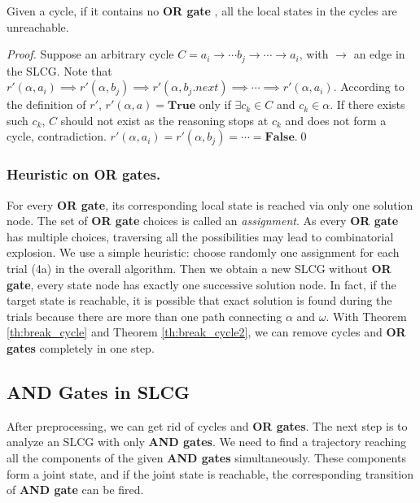 \documentclass[runningheads]{llncs}
\begin{document}
\begin{theorem}\label{th:break_cycle2}
Given a cycle, if it contains no \textbf{OR gate}%
, all the local states in the cycles are unreachable.
\end{theorem}

\begin{proof}
Suppose an arbitrary cycle $C=a_i\to \cdots b_j\to\cdots \to a_i$, with $\to$ an edge in the SLCG.
Note that $r'(\alpha,a_i)\implies r'(\alpha,b_j)\implies r'(\alpha,b_j.next)\implies \cdots\implies r'(\alpha,a_i)$.
According to the definition of $r'$, $r'(\alpha,a)=\mathbf{True}$ only if $\exists c_k\in C$ and $c_k\in \alpha$.
If there exists such $c_k$, $C$ should not exist as the reasoning stops at $c_k$ and does not form a cycle, contradiction.
$r'(\alpha,a_i)=r'(\alpha,b_j)=\cdots =\mathbf{False}$.\qed
\end{proof}

\subsubsection{Heuristic on OR gates.}\label{sec:OR}
For every \textbf{OR gate}, its corresponding local state is reached via only one solution node.
The set of \textbf{OR gate} choices is called an \textit{assignment}.
As every \textbf{OR gate} has multiple choices, traversing all the possibilities may lead to combinatorial explosion.
We use a simple heuristic: 
choose randomly one assignment for each trial (4a) in the overall algorithm.
Then we obtain a new SLCG without \textbf{OR gate}, every state node has exactly one successive solution node.
In fact, if the target state is reachable, it is possible that exact solution is found during the trials because there are more than one path connecting $\alpha$ and $\omega$.
With Theorem \ref{th:break_cycle} and Theorem \ref{th:break_cycle2}, we can remove cycles and \textbf{OR gates} completely in one step.

\subsection{AND Gates in SLCG}\label{sectAndGates}
After preprocessing, we can get rid of cycles and \textbf{OR gates}.
The next step is to analyze an SLCG with only \textbf{AND gates}.
We need to find a trajectory reaching all the components of the given \textbf{AND gates} simultaneously.
These components form a joint state, and if the joint state is reachable, the corresponding transition of \textbf{AND gate} can be fired. 
\end{document}
